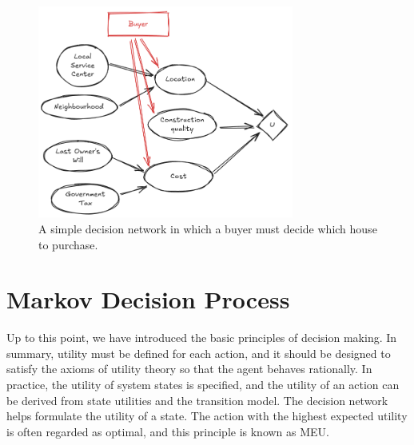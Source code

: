 \begin{figure}[!htb]
	\centering
	\includegraphics[width=0.75\textwidth]{./chapters/part-1/figures/decision_network_exp.png}
	\caption{A simple decision network in which a buyer must decide which house to purchase.}
	\label{fig:decisionnetworkexp}
\end{figure}

\section{Markov Decision Process} \label{sec:mdp}

Up to this point, we have introduced the basic principles of decision making. In summary, utility must be defined for each action, and it should be designed to satisfy the axioms of utility theory so that the agent behaves rationally. In practice, the utility of system states is specified, and the utility of an action can be derived from state utilities and the transition model. The decision network helps formulate the utility of a state. The action with the highest expected utility is often regarded as optimal, and this principle is known as MEU.

